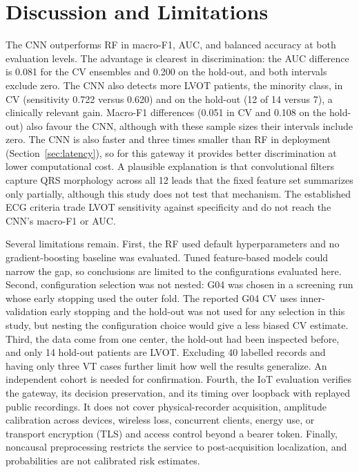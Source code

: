 \documentclass[conference,a4paper]{IEEEtran}
\begin{document}
\section{Discussion and Limitations}
\label{sec:limits}
The CNN outperforms RF in macro-F1, AUC, and balanced accuracy at both evaluation levels. The advantage is clearest in discrimination: the AUC difference is 0.081 for the CV ensembles and 0.200 on the hold-out, and both intervals exclude zero. The CNN also detects more LVOT patients, the minority class, in CV (sensitivity 0.722 versus 0.620) and on the hold-out (12 of 14 versus 7), a clinically relevant gain. Macro-F1 differences (0.051 in CV and 0.108 on the hold-out) also favour the CNN, although with these sample sizes their intervals include zero. The CNN is also faster and three times smaller than RF in deployment (Section~\ref{sec:latency}), so for this gateway it provides better discrimination at lower computational cost. A plausible explanation is that convolutional filters capture QRS morphology across all 12 leads that the fixed feature set summarizes only partially, although this study does not test that mechanism. The established ECG criteria trade LVOT sensitivity against specificity and do not reach the CNN's macro-F1 or AUC.

Several limitations remain. First, the RF used default hyperparameters and no gradient-boosting baseline was evaluated. Tuned feature-based models could narrow the gap, so conclusions are limited to the configurations evaluated here. Second, configuration selection was not nested: G04 was chosen in a screening run whose early stopping used the outer fold. The reported G04 CV uses inner-validation early stopping and the hold-out was not used for any selection in this study, but nesting the configuration choice would give a less biased CV estimate. Third, the data come from one center, the hold-out had been inspected before, and only 14 hold-out patients are LVOT. Excluding 40 labelled records and having only three VT cases further limit how well the results generalize. An independent cohort is needed for confirmation. Fourth, the IoT evaluation verifies the gateway, its decision preservation, and its timing over loopback with replayed public recordings. It does not cover physical-recorder acquisition, amplitude calibration across devices, wireless loss, concurrent clients, energy use, or transport encryption (TLS) and access control beyond a bearer token. Finally, noncausal preprocessing restricts the service to post-acquisition localization, and probabilities are not calibrated risk estimates.
\end{document}
